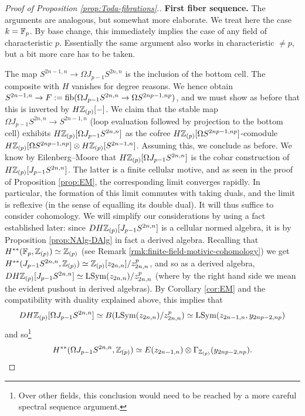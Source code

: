 \documentclass{amsart}
\renewcommand{\NB}[1]{}
\renewcommand{\todo}[1]{}
\numberwithin{proposition}{section}
\numberwithin{equation}{section}
\def\LSym{\mathrm{LSym}}
\begin{document}
\begin{proof}[Proof of Proposition \ref{prop:Toda-fibrations}.]
\textbf{First fiber sequence.}
The arguments are analogous, but somewhat more elaborate.
We treat here the case $k=\mathbb{F}_p$.
By base change, this immediately implies the case of any field of characteristic $p$.
Essentially the same argument also works in characteristic $\ne p$, but a bit more care has to be taken.\todo{should we reformulate the proposition to only claim this for fields of characteristic $p$?}

The map $S^{2n-1,n} \to \Omega J_{p-1} S^{2n,n}$ is the inclusion of the bottom cell.
The composite with $H$ vanishes for degree reasons.\NB{If $n=1$, $p=2$, this would not work. But then the source is $\Gm$ which we shouldn't $p$-localize anyway.}
We hence obtain $S^{2n-1,n} \to F := \mathrm{fib}(\Omega J_{p-1} S^{2n,n} \to \Omega S^{2np-1,np})$, and we must show as before that this is inverted by $H\mathbb{Z}_{(p)}[\mathord-]$.
We claim that the stable map $\Omega J_{p-1} S^{2n,n} \to S^{2n-1,n}$ (loop evaluation followed by projection to the bottom cell) exhibits $H\mathbb{Z}_{(p)}[\Omega J_{p-1} S^{2n,n}]$ as the cofree $H\mathbb{Z}_{(p)}[\Omega S^{2np-1,np}]$-comodule $H\mathbb{Z}_{(p)}[\Omega S^{2np-1,np}] \otimes H\mathbb{Z}_{(p)}[S^{2n-1,n}]$.
Assuming this, we conclude as before.
We know by Eilenberg--Moore that $H\mathbb{Z}_{(p)}[\Omega J_{p-1} S^{2n,n}]$ is the cobar construction of $H\mathbb{Z}_{(p)}[J_{p-1}S^{2n,n}]$.
The latter is a finite cellular motive, and as seen in the proof of Proposition \ref{prop:EM}, the corresponding limit converges rapidly.
In particular, the formation of this limit commutes with taking duals, and the limit is reflexive (in the sense of equalling its double dual).
It will thus suffice to consider cohomology.
We will simplify our considerations by using a fact established later: since $DH\mathbb{Z}_{(p)}[J_{p-1}S^{2n,n}]$ is a cellular normed algebra, it is by Proposition \ref{prop:NAlg-DAlg} in fact a derived algebra.
Recalling that $H^{**}(\mathbb{F}_p, \mathbb{Z}_{(p)}) \simeq \mathbb{Z}_{(p)}$ (see Remark \ref{rmk:finite-field-motivic-cohomology}) we get $H^{**}(J_{p-1} S^{2n,n}, \mathbb{Z}_{(p)}) \simeq \mathbb{Z}_{(p)}[z_{2n,n}]/z_{2n,n}^p$, and so as a derived algebra, $DH\Z_{(p)}[J_{p-1}S^{2n,n}] \wequi \LSym(z_{2n,n})/z_{2n,n}^p$ (where by the right hand side we mean the evident pushout in derived algebras).
By Corollary \ref{cor:EM} and the compatibility with duality explained above, this implies that \[ DH\Z_{(p)}[\Omega J_{p-1}S^{2n,n}] \wequi B(\LSym(z_{2n,n})/z_{2n,n}^p) \wequi \LSym(z_{2n-1,n},y_{2np-2,np}) \] and so\footnote{Over other fields, this conclusion would need to be reached by a more careful spectral sequence argument.} \[ H^{**}(\Omega J_{p-1}S^{2n,n}, \mathbb{Z}_{(p)}) \simeq E(z_{2n-1,n}) \otimes \Gamma_{\mathbb{Z}_{(p)}}(y_{2np-2,np}). \]

\end{proof}
\end{document}

